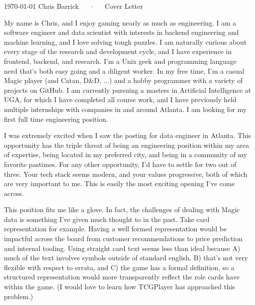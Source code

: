 \documentclass[11pt, letterpaper]{awesome-cv}
\begin{document}
\makecvheader[C]

\makecvfooter
  {\today}
  {Chris Barrick~~~·~~~Cover Letter}
  {\thepage}

\makelettertitle

\begin{cvletter}

My name is Chris, and I enjoy gaming nearly as much as engineering. I am a software engineer and data scientist with interests in backend engineering and machine learning, and I love solving tough puzzles. I am naturally curious about every stage of the research and development cycle, and I have experience in frontend, backend, and research. I'm a Unix geek and programming language nerd that's both easy going and a diligent worker. In my free time, I'm a casual Magic player (and Catan, D\&D, ...) and a hobby programmer with a variety of projects on GitHub. I am currently pursuing a masters in Artificial Intelligence at UGA, for which I have completed all course work, and I have previously held multiple internships with companies in and around Atlanta. I am looking for my first full time engineering position.

I was extremely excited when I saw the posting for data engineer in Atlanta. This opportunity has the triple threat of being an engineering position within my area of expertise, being located in my preferred city, and being in a community of my favorite pastimes. For any other opportunity, I'd have to settle for two out of three. Your tech stack seems modern, and your values progressive, both of which are very important to me. This is easily the most exciting opening I've come across.

This position fits me like a glove. In fact, the challenges of dealing with Magic data is something I've given much thought to in the past. Take card representation for example. Having a well formed representation would be impactful across the board from customer recommendations to price prediction and internal tooling. Using straight card text seems less than ideal because A) much of the text involves symbols outside of standard english, B) that's not very flexible with respect to errata, and C) the game has a formal definition, so a structured representation would more transparently reflect the role cards have within the game. (I would love to learn how TCGPlayer has approached this problem.)


\end{cvletter}
\end{document}
